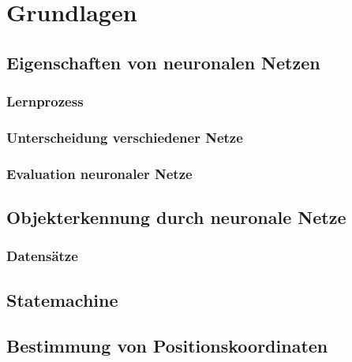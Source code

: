 \chapter{Grundlagen}
\label{ch: Grundlagen}
	
 
	
 	\section{Eigenschaften von neuronalen Netzen}
	\label{sec: ROS}
	
		\subsection{Lernprozess}
		
		\subsection{Unterscheidung verschiedener Netze}
		
		\subsection{Evaluation neuronaler Netze}
		
		
	\section{Objekterkennung durch neuronale Netze}
	\label{sec: Mecanumräder}
		
		\subsection{Datensätze}
		
	

			
	\section{Statemachine}
	\label{sec: Regelung}
	
	
		
		
	\section{Bestimmung von Positionskoordinaten}
	
	

